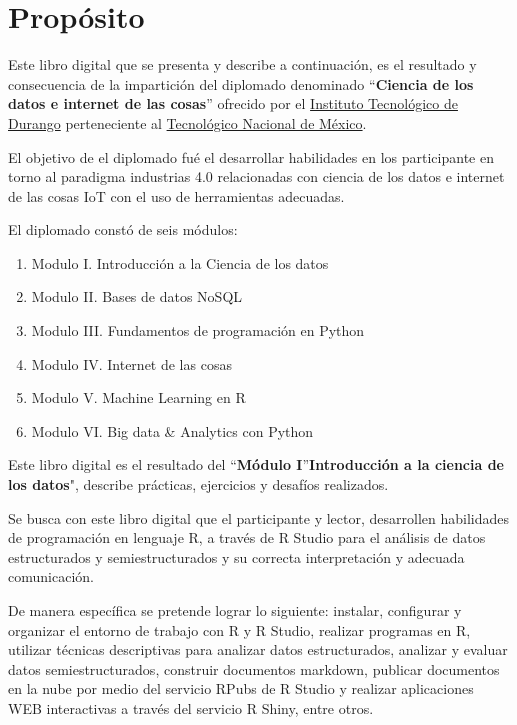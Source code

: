 \documentclass[
]{book}
\begin{document}
\hypertarget{propuxf3sito}{%
\section{Propósito}\label{propuxf3sito}}

Este libro digital que se presenta y describe a continuación, es el resultado y consecuencia de la impartición del diplomado denominado ``\textbf{Ciencia de los datos e internet de las cosas}'' ofrecido por el \href{https://www.itdurango.edu.mx/}{Instituto Tecnológico de Durango} perteneciente al \href{https://www.tecnm.mx/}{Tecnológico Nacional de México}.

El objetivo de el diplomado fué el desarrollar habilidades en los participante en torno al paradigma industrias 4.0 relacionadas con ciencia de los datos e internet de las cosas IoT con el uso de herramientas adecuadas.

El diplomado constó de seis módulos:

\begin{enumerate}
\def\labelenumi{\arabic{enumi}.}
\item
  Modulo I. Introducción a la Ciencia de los datos
\item
  Modulo II. Bases de datos NoSQL
\item
  Modulo III. Fundamentos de programación en Python
\item
  Modulo IV. Internet de las cosas
\item
  Modulo V. Machine Learning en R
\item
  Modulo VI. Big data \& Analytics con Python
\end{enumerate}

Este libro digital es el resultado del ``\textbf{Módulo I}''\textbf{Introducción a la ciencia de los datos}", describe prácticas, ejercicios y desafíos realizados.

Se busca con este libro digital que el participante y lector, desarrollen habilidades de programación en lenguaje R, a través de R Studio para el análisis de datos estructurados y semiestructurados y su correcta interpretación y adecuada comunicación.

De manera específica se pretende lograr lo siguiente: instalar, configurar y organizar el entorno de trabajo con R y R Studio, realizar programas en R, utilizar técnicas descriptivas para analizar datos estructurados, analizar y evaluar datos semiestructurados, construir documentos markdown, publicar documentos en la nube por medio del servicio RPubs de R Studio y realizar aplicaciones WEB interactivas a través del servicio R Shiny, entre otros.
\end{document}
